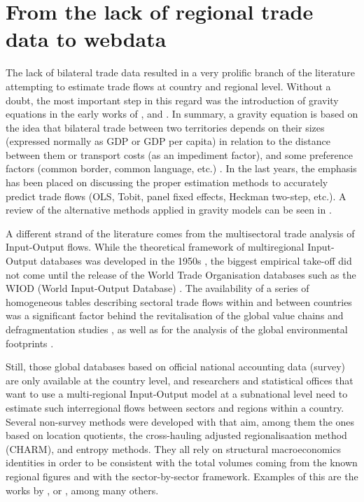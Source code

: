\documentclass[sigconf]{acmart}
\begin{document}
\hypertarget{sec:2}{%
	\section{From the lack of regional trade data to webdata}\label{sec:2}}

The lack of bilateral trade data resulted in a very prolific branch of
the literature attempting to estimate trade flows at country and
regional level. Without a doubt, the most important step in this regard
was the introduction of gravity equations in the early works of
\citet{tinbergen1962shaping}, \citet{linnemann1966econometric} and
\citet{leamer1r}. In summary, a gravity equation is based on the idea
that bilateral trade between two territories depends on their sizes
(expressed normally as GDP or GDP per capita) in relation to the
distance between them or transport costs (as an impediment factor), and
some preference factors (common border, common language, etc.)
\citep{egger2002econometric, anderson2003gravity}. In the last years,
the emphasis has been placed on discussing the proper estimation methods
to accurately predict trade flows (OLS, Tobit, panel fixed effects,
Heckman two-step, etc.). A review of the alternative methods applied in
gravity models can be seen in \citet{gomez2013comparing}.

A different strand of the literature comes from the multisectoral trade
analysis of Input-Output flows. While the theoretical framework of
multiregional Input-Output databases was developed in the 1950s
\citep{isard1956location}, the biggest empirical take-off did not come
until the release of the World Trade Organisation databases such as the
WIOD (World Input-Output Database)
\citep{dietzenbacher2013construction}. The availability of a series of
homogeneous tables describing sectoral trade flows within and between
countries was a significant factor behind the revitalisation of the
global value chains and defragmentation studies
\citep{timmer2015illustrated, los2015global, los2016tracing, antras2018measurement},
as well as for the analysis of the global environmental footprints
\citep{arto2014comparing, owen2016explaining}.

Still, those global databases based on official national accounting data
(survey) are only available at the country level, and researchers and
statistical offices that want to use a multi-regional Input-Output model
at a subnational level need to estimate such interregional flows between
sectors and regions within a country. Several non-survey methods were
developed with that aim, among them the ones based on location
quotients, the cross-hauling adjusted regionalisaation method (CHARM),
and entropy methods. They all rely on structural macroeconomics
identities in order to be consistent with the total volumes coming from
the known regional figures and with the sector-by-sector framework.
Examples of this are the works by \citet{sargento2012inter},
\citet{tobben2015construction} or \citet{boero2018regional}, among many
others.
\end{document}

